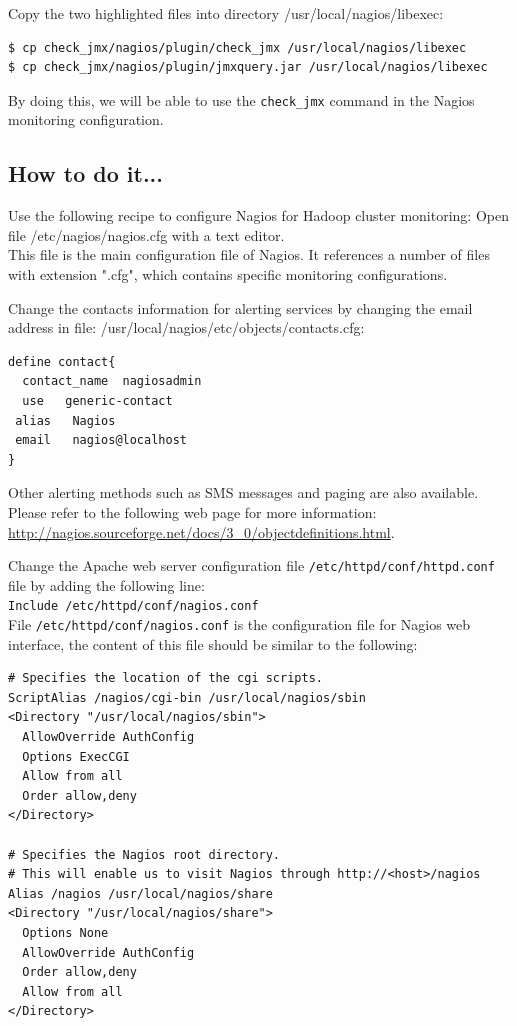 Copy the two highlighted files into directory /usr/local/nagios/libexec:
\lstset{style=bashstyle}
\begin{lstlisting}[language=bash]
$ cp check_jmx/nagios/plugin/check_jmx /usr/local/nagios/libexec
$ cp check_jmx/nagios/plugin/jmxquery.jar /usr/local/nagios/libexec
\end{lstlisting}

By doing this, we will be able to use the \verb|check_jmx| command in the Nagios monitoring configuration.

\subsection*{How to do it...}
Use the following recipe to configure Nagios for Hadoop cluster monitoring:
Open file /etc/nagios/nagios.cfg with a text editor. \\

This file is the main configuration file of Nagios. It references a number of files with extension ".cfg", which contains specific monitoring configurations.

Change the contacts information for alerting services by changing the email address in file: /usr/local/nagios/etc/objects/contacts.cfg: 
\lstset{style=bashstyle}
\begin{lstlisting}
define contact{
  contact_name  nagiosadmin
  use   generic-contact
 alias   Nagios
 email   nagios@localhost
}
\end{lstlisting}

Other alerting methods such as SMS messages and paging are also available. Please refer to the following web page for more information: \url{http://nagios.sourceforge.net/docs/3_0/objectdefinitions.html}.

Change the Apache web server configuration file \verb|/etc/httpd/conf/httpd.conf| file by adding the following line: \\
\verb|Include /etc/httpd/conf/nagios.conf| \\
File \verb|/etc/httpd/conf/nagios.conf| is the configuration file for Nagios web interface, the content of this file should be similar to the following:
\lstset{style=bashstyle}
\begin{lstlisting}
# Specifies the location of the cgi scripts.
ScriptAlias /nagios/cgi-bin /usr/local/nagios/sbin
<Directory "/usr/local/nagios/sbin">
  AllowOverride AuthConfig
  Options ExecCGI
  Allow from all
  Order allow,deny
</Directory>

# Specifies the Nagios root directory.
# This will enable us to visit Nagios through http://<host>/nagios
Alias /nagios /usr/local/nagios/share
<Directory "/usr/local/nagios/share">
  Options None
  AllowOverride AuthConfig
  Order allow,deny
  Allow from all
</Directory>
\end{lstlisting}

